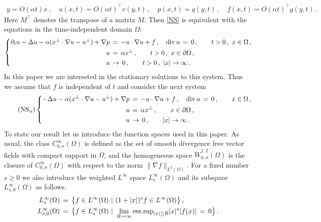 \documentclass[11pt,a4paper]{article}
\begin{document}
%
\begin{align*}
y = O (\alpha t) x\,, \quad u (x,t) = O (\alpha t)^\top v (y,t)\,, \quad p (x,t) = q (y,t)\,, \quad f (x,t) = O (\alpha t)^\top g (y,t)\,.
\end{align*}
%
Here $M^\top$ denotes the transpose of a matrix $M$. Then \eqref{NS} is equivalent with the equations in the time-independent domain $\Omega$:
%
\begin{equation*}
  \left\{
\begin{aligned}
 \partial_t u -\Delta u - \alpha ( x^\bot \cdot \nabla u - u^\bot ) + \nabla p & \,=\,  - u\cdot\nabla u  + f \,,  
 \quad {\rm div}\, u \,=\, 0\,, ~~~~~~ t>0\,,~x \in \Omega\,, \\
  u  & \,=\, \alpha x^\bot \,, ~~~~~~ t>0\,,~ x \in \partial \Omega\,, \\
  u  & \, \rightarrow \,     0   \,,  ~~~~~~ t>0\,,~ |x| \rightarrow \infty\,.
\end{aligned}\right.
\end{equation*}
%
In this paper we are interested in the stationary solutions to this system. Thus we assume that $f$ is independent of $t$ and consider the next system
%
\begin{equation}\tag{NS$_{\alpha}$}\label{NS_alpha.intro}
  \left\{\begin{aligned}
  -\Delta u - \alpha ( x^\bot \cdot \nabla u - u^\bot ) + \nabla p  &\,=\, - u\cdot\nabla u  + f \,, 
  \quad {\rm div}\, u \,=\, 0\,,  ~~~~~~   x \in \Omega\,, \\
 u  & \, =\,  \alpha x^\bot   \,,  ~~~~~~ x\in \partial\Omega\,, \\
 u  & \, \rightarrow \,     0   \,,  ~~~~~~ |x| \rightarrow \infty\,.
\end{aligned}\right.
\end{equation}
%
To state our result let us introduce the function spaces used in this paper. 
As usual, the class $C_{0,\sigma}^\infty (\Omega)$ is defined as the set of smooth divergence free vector fields with compact support in $\Omega$, and the homogeneous space $\dot{W}^{1,2}_{0,\sigma} (\Omega)$ is the closure of $C_{0,\sigma}^\infty (\Omega)$ with respect to the norm $\| \nabla f\|_{L^2 (\Omega)}$.
For a fixed number $s\geq 0$ we also introduce the weighted $L^\infty$ space $L^\infty_s (\Omega)$ 
and its subspace $L^\infty_{s,0}(\Omega)$ as follows.
%
\begin{align}\label{def.L^infty_s}
\begin{split}
L^\infty_s (\Omega) & \, = \, \big \{ f\in L^\infty (\Omega)~|~ (1+|x|)^s f \in L^\infty (\Omega) \big \}\,,\\
L^\infty_{s,0} (\Omega) & \, = \, \big \{ f\in L^\infty_s (\Omega) ~|~ \lim_{R\rightarrow \infty} {\rm ess.sup}_{|x|\geq R} |x|^s |f(x)| \, = \, 0\big \}\,.
\end{split}
\end{align}
\end{document}
